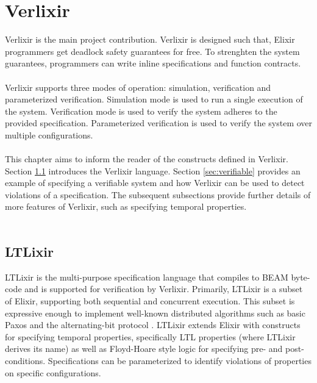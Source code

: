 \chapter{Verlixir} \label{chap:verlixir}
Verlixir is the main project contribution. Verlixir is designed such that, Elixir programmers get deadlock safety guarantees for free. To strenghten the system guarantees, programmers can write inline specifications and function contracts. 
\\ \\
Verlixir supports three modes of operation: simulation, verification and parameterized verification. Simulation mode is used to run a single execution of the system. Verification mode is used to verify the system adheres to the provided specification. Parameterized verification is used to verify the system over multiple configurations.
\\ \\
This chapter aims to inform the reader of the constructs defined in Verlixir. Section \ref{sec:ltlixir} introduces the Verlixir language. Section \ref{sec:verifiable} provides an example of specifying a verifiable system and how Verlixir can be used to detect violations of a specification. The subsequent subsections provide further details of more features of Verlixir, such as specifying temporal properties.
\\ \\
\section{LTLixir} \label{sec:ltlixir}
LTLixir is the multi-purpose specification language that compiles to BEAM byte-code and is supported for verification by Verlixir. Primarily, LTLixir is a subset of Elixir, supporting both sequential and concurrent execution. This subset is expressive enough to implement well-known distributed algorithms such as basic Paxos \cite{basic_paxos} and the alternating-bit protocol \cite{ab_protocol}. LTLixir extends Elixir with constructs for specifying temporal properties, specifically LTL properties (where LTLixir derives its name) as well as Floyd-Hoare style logic for specifying pre- and post-conditions. Specifications can be parameterized to identify violations of properties on specific configurations. 
\\ \\
